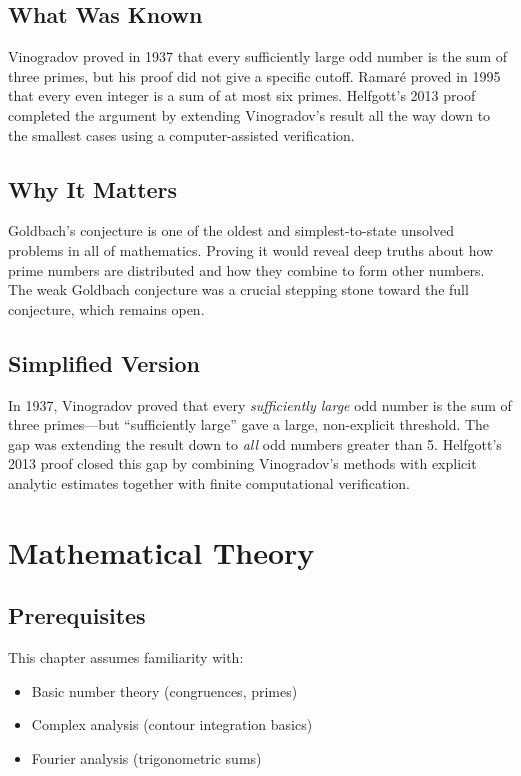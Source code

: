 \subsection{What Was Known}
Vinogradov proved in 1937 that every sufficiently large odd number is the sum of three primes, but his proof did not give a specific cutoff. Ramar\'e proved in 1995 that every even integer is a sum of at most six primes. Helfgott's 2013 proof completed the argument by extending Vinogradov's result all the way down to the smallest cases using a computer-assisted verification.

\subsection{Why It Matters}
Goldbach's conjecture is one of the oldest and simplest-to-state unsolved problems in all of mathematics. Proving it would reveal deep truths about how prime numbers are distributed and how they combine to form other numbers. The weak Goldbach conjecture was a crucial stepping stone toward the full conjecture, which remains open.

\subsection{Simplified Version}
In 1937, Vinogradov proved that every \emph{sufficiently large} odd number is the sum of three primes---but ``sufficiently large'' gave a large, non-explicit threshold. The gap was extending the result down to \emph{all} odd numbers greater than 5. Helfgott's 2013 proof closed this gap by combining Vinogradov's methods with explicit analytic estimates together with finite computational verification.

\section{Mathematical Theory}


\subsection{Prerequisites}
This chapter assumes familiarity with:
\begin{itemize}
\item Basic number theory (congruences, primes)
\item Complex analysis (contour integration basics)
\item Fourier analysis (trigonometric sums)
\end{itemize}

